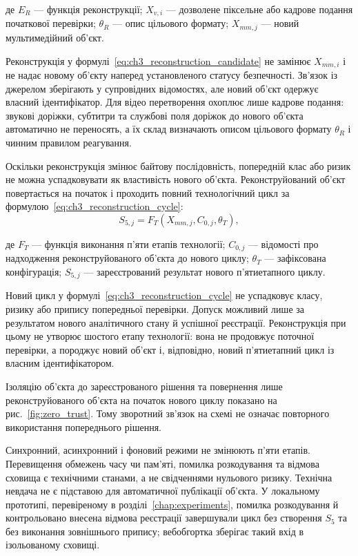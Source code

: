 де $E_R$ --- функція реконструкції; $X_{v,i}$ --- дозволене піксельне або кадрове подання початкової перевірки; $\theta_R$ --- опис цільового формату; $X_{mm,j}$ --- новий мультимедійний об’єкт.

Реконструкція у формулі~\eqref{eq:ch3_reconstruction_candidate} не замінює $X_{mm,i}$ і не надає новому об’єкту наперед установленого статусу безпечності. Зв’язок із джерелом зберігають у супровідних відомостях, але новий об’єкт одержує власний ідентифікатор. Для відео перетворення охоплює лише кадрове подання: звукові доріжки, субтитри та службові поля доріжок до нового об’єкта автоматично не переносять, а їх склад визначають описом цільового формату $\theta_R$ і чинним правилом реагування.

Оскільки реконструкція змінює байтову послідовність, попередній клас або ризик не можна успадковувати як властивість нового об’єкта. Реконструйований об’єкт повертається на початок і проходить повний технологічний цикл за формулою~\eqref{eq:ch3_reconstruction_cycle}:
\begin{equation}
S_{5,j}=F_T(X_{mm,j},C_{0,j},\theta_T),
\label{eq:ch3_reconstruction_cycle}
\end{equation}

де $F_T$ --- функція виконання п’яти етапів технології; $C_{0,j}$ --- відомості про надходження реконструйованого об’єкта до нового циклу; $\theta_T$ --- зафіксована конфігурація; $S_{5,j}$ --- зареєстрований результат нового п’ятиетапного циклу.

Новий цикл у формулі~\eqref{eq:ch3_reconstruction_cycle} не успадковує класу, ризику або припису попередньої перевірки. Допуск можливий лише за результатом нового аналітичного стану й успішної реєстрації. Реконструкція при цьому не утворює шостого етапу технології: вона не продовжує поточної перевірки, а породжує новий об’єкт і, відповідно, новий п’ятиетапний цикл із власним ідентифікатором.

Ізоляцію об’єкта до зареєстрованого рішення та повернення лише реконструйованого об’єкта на початок нового циклу показано на рис.~\ref{fig:zero_trust}. Тому зворотний зв’язок на схемі не означає повторного використання попереднього рішення.



Синхронний, асинхронний і фоновий режими не змінюють п’яти етапів. Перевищення обмежень часу чи пам’яті, помилка розкодування та відмова сховища є технічними станами, а не свідченнями нульового ризику. Технічна невдача не є підставою для автоматичної публікації об’єкта. У локальному прототипі, перевіреному в розділі~\ref{chap:experiments}, помилка розкодування й контрольовано внесена відмова реєстрації завершували цикл без створення $S_5$ та без виконання зовнішнього припису; вебобгортка зберігає такий вхід в ізольованому сховищі.

